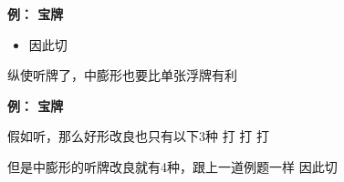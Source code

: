\documentclass[小V的日麻笔记.tex]{subfiles}
\begin{document}
\textbf{例： 宝牌 } 


\begin{itemize}
\arrowitem 这题既有 的4连形也有的中膨形，无论那边的复合形都有不错的延伸改良
\arrowitem 浮牌的的好形靠张也只有和
\arrowitem 而中膨形则有以下的改良 \newline
{} \newline
{} \newline
{} \newline
{}
\item[\ding{213}] 因此切 
\end{itemize}

纵使听牌了，中膨形也要比单张浮牌有利

\textbf{例： 宝牌 } 


\begin{itemize}
\arrowitem 假如听，那么好形改良也只有以下3种 \newline
{} 打  \newline
{} 打  \newline
{} 打  \newline

\arrowitem 但是中膨形的听牌改良就有4种，跟上一道例题一样
\arrowitem 因此切 
\end{itemize}
\end{document}
